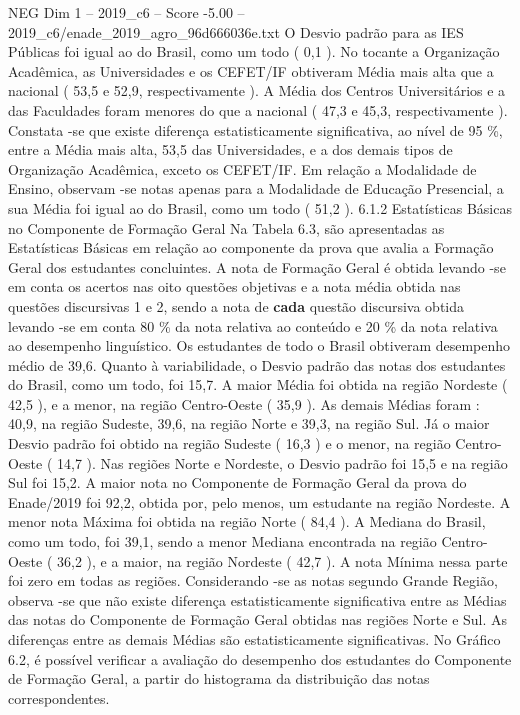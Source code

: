 \begin{textsample}{NEG Dim 1 – 2019\_c6 – Score -5.00 – 2019\_c6/enade\_2019\_agro\_96d666036e.txt}
O Desvio padrão para as IES Públicas foi igual ao do Brasil, como um todo ( 0,1 ).
No tocante a Organização Acadêmica, as Universidades e os CEFET/IF obtiveram Média mais alta que a nacional ( 53,5 e 52,9, respectivamente ).
A Média dos Centros Universitários e a das Faculdades foram menores do que a nacional ( 47,3 e 45,3, respectivamente ).
Constata -se que existe diferença estatisticamente significativa, ao nível de 95 \%, entre a Média mais alta, 53,5 das Universidades, e a dos demais tipos de Organização Acadêmica, exceto os CEFET/IF.
Em relação a Modalidade de Ensino, observam -se notas apenas para a Modalidade de Educação Presencial, a sua Média foi igual ao do Brasil, como um todo ( 51,2 ). 6.1.2 Estatísticas Básicas no Componente de Formação Geral Na Tabela 6.3, são apresentadas as Estatísticas Básicas em relação ao componente da prova que avalia a Formação Geral dos estudantes concluintes.
A nota de Formação Geral é obtida levando -se em conta os acertos nas oito questões objetivas e a nota média obtida nas questões discursivas 1 e 2, sendo a nota de \textbf{cada} questão discursiva obtida levando -se em conta 80 \% da nota relativa ao conteúdo e 20 \% da nota relativa ao desempenho linguístico.
Os estudantes de todo o Brasil obtiveram desempenho médio de 39,6.
Quanto à variabilidade, o Desvio padrão das notas dos estudantes do Brasil, como um todo, foi 15,7.
A maior Média foi obtida na região Nordeste ( 42,5 ), e a menor, na região Centro-Oeste ( 35,9 ).
As demais Médias foram : 40,9, na região Sudeste, 39,6, na região Norte e 39,3, na região Sul.
Já o maior Desvio padrão foi obtido na região Sudeste ( 16,3 ) e o menor, na região Centro-Oeste ( 14,7 ).
Nas regiões Norte e Nordeste, o Desvio padrão foi 15,5 e na região Sul foi 15,2.
A maior nota no Componente de Formação Geral da prova do Enade/2019 foi 92,2, obtida por, pelo menos, um estudante na região Nordeste.
A menor nota Máxima foi obtida na região Norte ( 84,4 ).
A Mediana do Brasil, como um todo, foi 39,1, sendo a menor Mediana encontrada na região Centro-Oeste ( 36,2 ), e a maior, na região Nordeste ( 42,7 ).
A nota Mínima nessa parte foi zero em todas as regiões.
Considerando -se as notas segundo Grande Região, observa -se que não existe diferença estatisticamente significativa entre as Médias das notas do Componente de Formação Geral obtidas nas regiões Norte e Sul.
As diferenças entre as demais Médias são estatisticamente significativas.
No Gráfico 6.2, é possível verificar a avaliação do desempenho dos estudantes do Componente de Formação Geral, a partir do histograma da distribuição das notas correspondentes.

\end{textsample}
